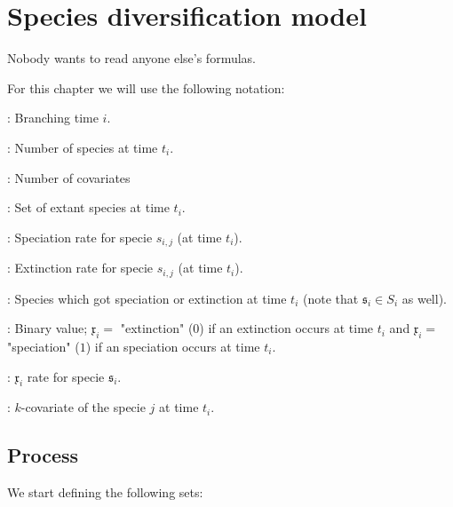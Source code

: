 \chapter{Species diversification model}
{\color{gray} \begin{fquote}  Nobody wants to read anyone else's formulas. \end{fquote} }



For this chapter we will use the following notation:



\begin{description}[leftmargin=!,labelwidth=\widthof{\bfseries The longest label}]
\item[$t_i$] : Branching time $i$.
\item[$n_i$] : Number of species at time $t_i$.
\item[$m$] : Number of covariates
\item[$S_i = \{ s_{i,1},...,s_{i,n_i}\}$] : Set of extant species at time $t_i$.
\item[$\lambda_{i,j}$] : Speciation rate for specie $s_{i,j}$ (at time $t_i$).
\item[$\mu_{i,j}$] : Extinction rate for specie $s_{i,j}$ (at time $t_i$).
\item[$\mathfrak{s}_i$] : Species which got speciation or extinction at time $t_i$ (note that $\mathfrak{s}_i \in S_i$ as well). 
\item[$\mathfrak{x}_1$] : Binary value; $\mathfrak{x}_i =$ "extinction" ($0$) if an extinction occurs at time $t_i$ and $\mathfrak{x}_i =$ "speciation" ($1$) if an speciation occurs at time $t_i$. 
\item[$\rho_i$] : $\mathfrak{x}_i$ rate for specie $\mathfrak{s}_i$.
\item[$x_{i,j,k}$] : $k$-covariate of the specie $j$ at time $t_i$.
\end{description}

\vspace{1cm}
\newpage
\section{Process}
We start defining the following sets: 

